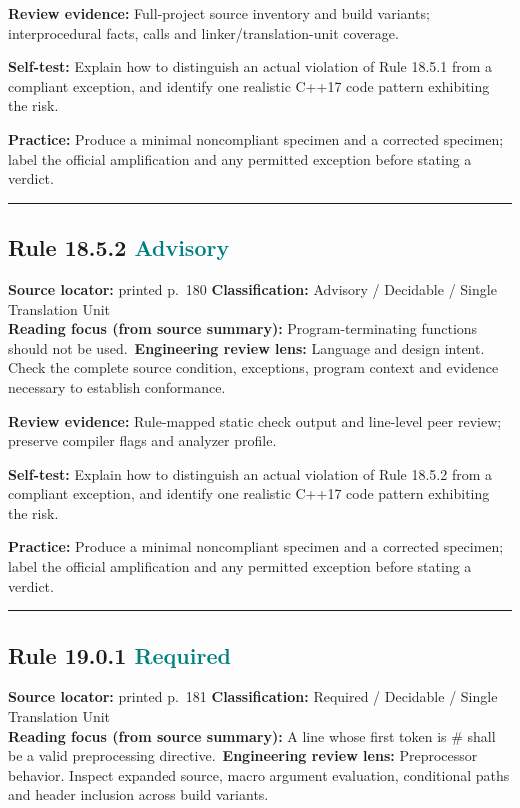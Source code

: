 \documentclass[10pt,letterpaper]{article}
\begin{document}
\textbf{Review evidence:} Full-project source inventory and build variants; interprocedural facts, calls and linker/translation-unit coverage.

\textbf{Self-test:} Explain how to distinguish an actual violation of Rule 18.5.1 from a compliant exception, and identify one realistic C++17 code pattern exhibiting the risk.\par
\textbf{Practice:} Produce a minimal noncompliant specimen and a corrected specimen; label the official amplification and any permitted exception before stating a verdict.
\smallskip\hrule\smallskip
\subsection*{Rule 18.5.2 \enspace \texorpdfstring{\small\textcolor{teal}{Advisory}}{Advisory}}
\noindent\textbf{Source locator:} printed p.~180 \quad\textbf{Classification:} Advisory / Decidable / Single Translation Unit\\
\textbf{Reading focus (from source summary):} Program-terminating functions should not be used.\
\textbf{Engineering review lens:} Language and design intent. Check the complete source condition, exceptions, program context and evidence necessary to establish conformance.

\textbf{Review evidence:} Rule-mapped static check output and line-level peer review; preserve compiler flags and analyzer profile.

\textbf{Self-test:} Explain how to distinguish an actual violation of Rule 18.5.2 from a compliant exception, and identify one realistic C++17 code pattern exhibiting the risk.\par
\textbf{Practice:} Produce a minimal noncompliant specimen and a corrected specimen; label the official amplification and any permitted exception before stating a verdict.
\smallskip\hrule\smallskip
\subsection*{Rule 19.0.1 \enspace \texorpdfstring{\small\textcolor{teal}{Required}}{Required}}
\noindent\textbf{Source locator:} printed p.~181 \quad\textbf{Classification:} Required / Decidable / Single Translation Unit\\
\textbf{Reading focus (from source summary):} A line whose first token is \# shall be a valid preprocessing directive.\
\textbf{Engineering review lens:} Preprocessor behavior. Inspect expanded source, macro argument evaluation, conditional paths and header inclusion across build variants.
\end{document}
